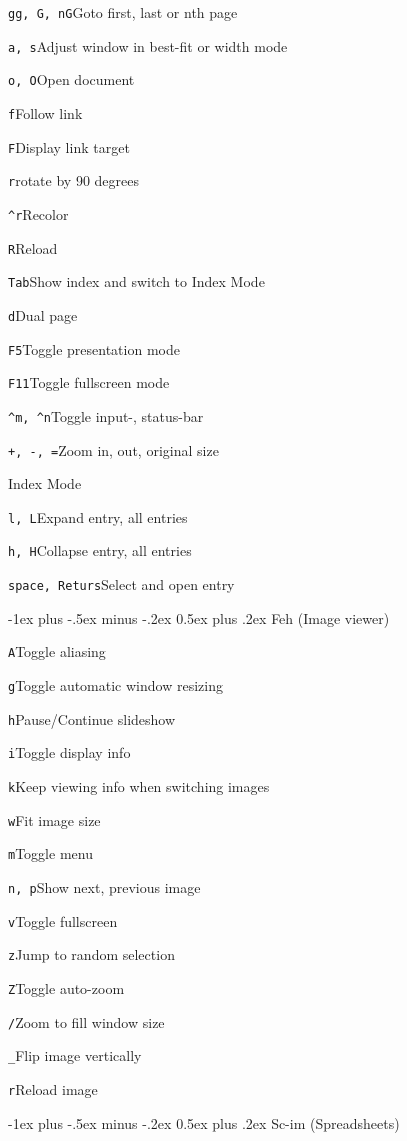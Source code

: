\documentclass[12pt,landscape]{article}
\makeatletter
\renewcommand{\section}{\@startsection{section}{1}{0mm}%
                                {-1ex plus -.5ex minus -.2ex}%
                                {0.5ex plus .2ex}%
                                {\normalfont\large\bfseries}}
\def\cm#1#2{{\tt#1}\dotfill#2\par}
\makeatother
\begin{document}
\begin{multicols}{3}
\cm{gg, G, nG}{Goto first, last or nth page}

\cm{a, s}{Adjust window in best-fit or width mode}

\cm{o, O}{Open document}

\cm{f}{Follow link}

\cm{F}{Display link target}

\cm{r}{rotate by 90 degrees}

\cm{\textasciicircum r}{Recolor}

\cm{R}{Reload}

\cm{Tab}{Show index and switch to Index Mode}

\cm{d}{Dual page}

\cm{F5}{Toggle presentation mode}

\cm{F11}{Toggle fullscreen mode}

\cm{\textasciicircum m, \textasciicircum n}{Toggle input-, status-bar}

\cm{+, -, =}{Zoom in, out, original size}

Index Mode

\cm{l, L}{Expand entry, all entries}

\cm{h, H}{Collapse entry, all entries}

\cm{space, Returs}{Select and open entry}

\section{Feh (Image viewer)}

\cm{A}{Toggle aliasing}

\cm{g}{Toggle automatic window resizing}

\cm{h}{Pause/Continue slideshow}

\cm{i}{Toggle display info}

\cm{k}{Keep viewing info when switching images}

\cm{w}{Fit image size}

\cm{m}{Toggle menu}

\cm{n, p}{Show next, previous image}

\cm{v}{Toggle fullscreen}

\cm{z}{Jump to random selection}

\cm{Z}{Toggle auto-zoom}

\cm{/}{Zoom to fill window size}

\cm{\_}{Flip image vertically}

\cm{r}{Reload image}

\section{Sc-im (Spreadsheets)}


\end{multicols}
\end{document}

